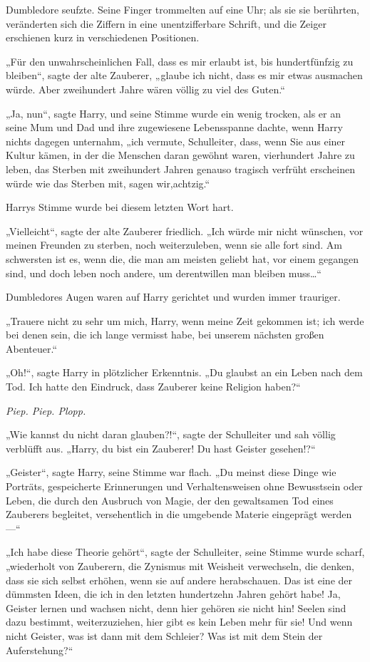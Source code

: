 {Dumbledore seufzte. Seine Finger trommelten auf eine Uhr; als sie sie berührten, veränderten sich die Ziffern in eine unentzifferbare Schrift, und die Zeiger erschienen kurz in verschiedenen Positionen.

„Für den unwahrscheinlichen Fall, dass es mir erlaubt ist, bis hundertfünfzig zu bleiben“, sagte der alte Zauberer, „glaube ich nicht, dass es mir etwas ausmachen würde. Aber zweihundert Jahre wären völlig zu viel des Guten.“

„Ja, nun“, sagte Harry, und seine Stimme wurde ein wenig trocken, als er an seine Mum und Dad und ihre zugewiesene Lebensspanne dachte, wenn Harry nichts dagegen unternahm, „ich vermute, Schulleiter, dass, wenn Sie aus einer Kultur kämen, in der die Menschen daran gewöhnt waren, vierhundert Jahre zu leben, das Sterben mit zweihundert Jahren genauso tragisch verfrüht erscheinen würde wie das Sterben mit, sagen wir,achtzig.“

Harrys Stimme wurde bei diesem letzten Wort hart.

„Vielleicht“, sagte der alte Zauberer friedlich. „Ich würde mir nicht wünschen, vor meinen Freunden zu sterben, noch weiterzuleben, wenn sie alle fort sind. Am schwersten ist es, wenn die, die man am meisten geliebt hat, vor einem gegangen sind, und doch leben noch andere, um derentwillen man bleiben muss…“

Dumbledores Augen waren auf Harry gerichtet und wurden immer trauriger.

„Trauere nicht zu sehr um mich, Harry, wenn meine Zeit gekommen ist; ich werde bei denen sein, die ich lange vermisst habe, bei unserem nächsten großen Abenteuer.“

„Oh!“, sagte Harry in plötzlicher Erkenntnis. „Du glaubst an ein Leben nach dem Tod. Ich hatte den Eindruck, dass Zauberer keine Religion haben?“

\emph{Piep. Piep. Plopp.}

„Wie kannst du nicht daran glauben?!“, sagte der Schulleiter und sah völlig verblüfft aus. „Harry, du bist ein Zauberer! Du hast Geister gesehen!?“

„Geister“, sagte Harry, seine Stimme war flach. „Du meinst diese Dinge wie Porträts, gespeicherte Erinnerungen und Verhaltensweisen ohne Bewusstsein oder Leben, die durch den Ausbruch von Magie, der den gewaltsamen Tod eines Zauberers begleitet, versehentlich in die umgebende Materie eingeprägt werden—“

„Ich habe diese Theorie gehört“, sagte der Schulleiter, seine Stimme wurde scharf, „wiederholt von Zauberern, die Zynismus mit Weisheit verwechseln, die denken, dass sie sich selbst erhöhen, wenn sie auf andere herabschauen. Das ist eine der dümmsten Ideen, die ich in den letzten hundertzehn Jahren gehört habe! Ja, Geister lernen und wachsen nicht, denn hier gehören sie nicht hin! Seelen sind dazu bestimmt, weiterzuziehen, hier gibt es kein Leben mehr für sie! Und wenn nicht Geister, was ist dann mit dem Schleier? Was ist mit dem Stein der Auferstehung?“

}
